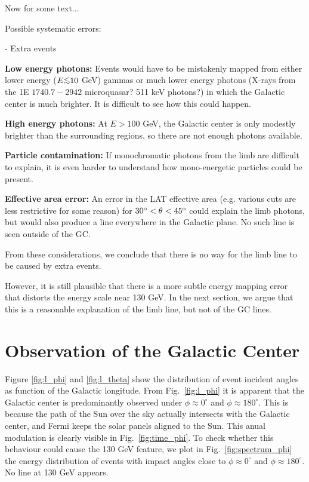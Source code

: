 \documentclass[aps,twocolumn,prd,superscriptaddress,showpacs,nofootinbib,fixfloat]{revtex4}
\newcommand{\degree}{^{\rm o}}
\def\la{\vcenter{\hbox{$<$}\offinterlineskip\hbox{$\sim$}}}
\begin{document}
\clearpage
Now for some text...


Possible systematic errors:

- Extra events

{\bf Low energy photons:} Events would have to be mistakenly mapped from
either lower energy ($E \la 10$ GeV) gammas or much lower energy photons
(X-rays from the 1E $1740.7-2942$ microquasar?  511 keV photons?) in which the
Galactic center is much brighter.  It is difficult to see how this could
happen.

{\bf High energy photons:} At $E > 100$ GeV, the Galactic center is only
modestly brighter than the surrounding regions, so there are not enough
photons available.

{\bf Particle contamination:} If monochromatic photons from the limb are
difficult to explain, it is even harder to understand how mono-energetic
particles could be present. 

{\bf Effective area error:} An error in the LAT effective area (e.g. various
cuts are less restrictive for some reason) for $30\degree < \theta <
45\degree$ could explain the limb photons, but would also produce a line
everywhere in the Galactic plane.  No such line is seen outside of the GC. 

From these considerations, we conclude that there is no way for the limb line
to be caused by extra events. 

However, it is still plausible that there is a more subtle energy mapping
error that distorts the energy scale near 130 GeV.  In the next section, we
argue that this is a reasonable explanation of the limb line, but not of the
GC lines. 

\section{Observation of the Galactic Center}
Figure \ref{fig:l_phi} and \ref{fig:l_theta} show the distribution of event
incident angles as function of the Galactic longitude. From
Fig.~\ref{fig:l_phi} it is apparent that the Galactic center is predominantly
observed under $\phi\approx 0^\circ$ and $\phi\approx 180^\circ$. This is
because the path of the Sun over the sky actually intersects with the Galactic
center, and Fermi keeps the solar panels aligned to the Sun. This anual
modulation is clearly visible in Fig.~\ref{fig:time_phi}. To check whether
this behaviour could cause the 130 GeV feature, we plot in
Fig.~\ref{fig:spectrum_phi} the energy distribution of events with impact
angles close to $\phi\approx0^\circ$ and $\phi\approx180^\circ$. No line at
130 GeV appears.
\end{document}
